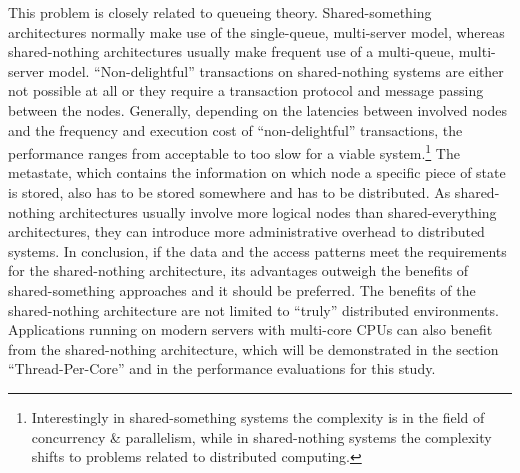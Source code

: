 This problem is closely related to queueing theory. Shared-something architectures normally make use of the single-queue, multi-server model, whereas shared-nothing architectures usually make frequent use of a multi-queue, multi-server model. \newline
“Non-delightful” transactions on shared-nothing systems are either not possible at all or they require a transaction protocol and message passing between the nodes. Generally, depending on the latencies between involved nodes and the frequency and execution cost of “non-delightful” transactions, the performance ranges from acceptable to too slow for a viable system.\footnote{Interestingly in shared-something systems the complexity is in the field of concurrency \& parallelism, while in shared-nothing systems the complexity shifts to problems related to distributed computing.}  \newline
The metastate, which contains the information on which node a specific piece of state is stored, also has to be stored somewhere and has to be distributed. \newline
As shared-nothing architectures usually involve more logical nodes than shared-everything architectures, they can introduce more administrative overhead to distributed systems.
In conclusion, if the data and the access patterns meet the requirements for the shared-nothing architecture, its advantages outweigh the benefits of shared-something approaches and it should be preferred. The benefits of the shared-nothing architecture are not limited to “truly” distributed environments. Applications running on modern servers with multi-core CPUs can also benefit from the shared-nothing architecture, which will be demonstrated in the section “Thread-Per-Core” and in the performance evaluations for this study.

